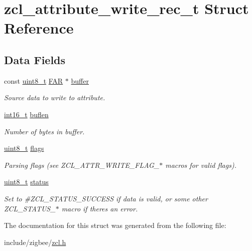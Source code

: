 \hypertarget{structzcl__attribute__write__rec__t}{}\section{zcl\+\_\+attribute\+\_\+write\+\_\+rec\+\_\+t Struct Reference}
\label{structzcl__attribute__write__rec__t}
\subsection*{Data Fields}
\begin{DoxyCompactItemize}
\item 
const \hyperlink{group__hal__dos_gae1affc9ca37cfb624959c866a73f83c2}{uint8\+\_\+t} \hyperlink{group__hal_gaef060b3456fdcc093a7210a762d5f2ed}{F\+AR} $\ast$ \hyperlink{group__zcl_ga669940d05e1abc9807300f7d34169496}{buffer}
\begin{DoxyCompactList}\small\item\em Source data to write to attribute. \end{DoxyCompactList}\item 
\hyperlink{group__hal__dos_ga2140805d08462d474b82ddc8d1c2f3e6}{int16\+\_\+t} \hyperlink{group__zcl_ga0d88b9a4d20f93d09002c72ef71cf861}{buflen}
\begin{DoxyCompactList}\small\item\em Number of bytes in {\ttfamily buffer}. \end{DoxyCompactList}\item 
\hyperlink{group__hal__dos_gae1affc9ca37cfb624959c866a73f83c2}{uint8\+\_\+t} \hyperlink{group__zcl_gaa2585d779da0ab21273a8d92de9a0ebe}{flags}
\begin{DoxyCompactList}\small\item\em Parsing flags (see Z\+C\+L\+\_\+\+A\+T\+T\+R\+\_\+\+W\+R\+I\+T\+E\+\_\+\+F\+L\+A\+G\+\_\+$\ast$ macros for valid flags). \end{DoxyCompactList}\item 
\hyperlink{group__hal__dos_gae1affc9ca37cfb624959c866a73f83c2}{uint8\+\_\+t} \hyperlink{group__zcl_gade818037fd6c985038ff29656089758d}{status}
\begin{DoxyCompactList}\small\item\em Set to \#\+Z\+C\+L\+\_\+\+S\+T\+A\+T\+U\+S\+\_\+\+S\+U\+C\+C\+E\+SS if data is valid, or some other Z\+C\+L\+\_\+\+S\+T\+A\+T\+U\+S\+\_\+$\ast$ macro if there\textquotesingle{}s an error. \end{DoxyCompactList}\end{DoxyCompactItemize}


The documentation for this struct was generated from the following file\+:\begin{DoxyCompactItemize}
\item 
include/zigbee/\hyperlink{zcl_8h}{zcl.\+h}\end{DoxyCompactItemize}
